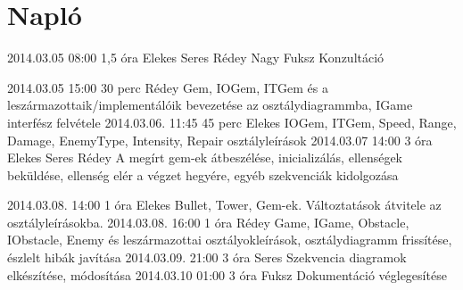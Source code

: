 %
\section{Napló}

\begin{naplo}


\bejegyzes
{2014.03.05 08:00}
{1,5 óra}
{Elekes
Seres
Rédey
Nagy
Fuksz}
{Konzultáció}

\bejegyzes
{2014.03.05 15:00}
{30 perc}
{Rédey}
{Gem, IOGem, ITGem és a leszármazottaik/implementálóik bevezetése az osztálydiagrammba, IGame interfész felvétele}
\bejegyzes
{2014.03.06. 11:45}
{45 perc}
{Elekes}
{IOGem, ITGem, Speed, Range, Damage, EnemyType, Intensity, Repair osztályleírások}
\bejegyzes
{2014.03.07 14:00}
{3 óra}
{Elekes
Seres
Rédey}
{A megírt gem-ek átbeszélése, inicializálás, ellenségek beküldése, ellenség elér a végzet hegyére, egyéb szekvenciák kidolgozása}

\bejegyzes
{2014.03.08. 14:00}
{1 óra}
{Elekes}
{Bullet, Tower, Gem-ek.
Változtatások átvitele az osztályleírásokba. }
\bejegyzes
{2014.03.08. 16:00}
{1 óra}
{Rédey}
{Game, IGame, Obstacle, IObstacle, Enemy és leszármazottai osztályokleírások, osztálydiagramm frissítése, észlelt hibák javítása}
\bejegyzes
{2014.03.09. 21:00}
{3 óra}
{Seres}
{Szekvencia diagramok elkészítése, módosítása}
\bejegyzes
{2014.03.10 01:00}
{3 óra}
{Fuksz}
{Dokumentáció véglegesítése}

			

\end{naplo}

